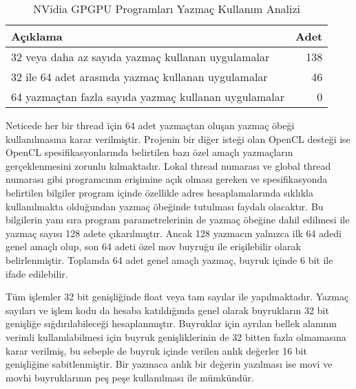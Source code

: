 \begin{longtable}{p{350pt} p{100pt} }
\caption{NVidia GPGPU Programları Yazmaç Kullanım Analizi} \label{table:NVidiaRegisterUsage} \\
\multicolumn{1}{l}{\textbf{Açıklama}} & \multicolumn{1}{r}{\textbf{Adet}}  \\ 
\hline 
\endfirsthead
32 veya daha az sayıda yazmaç kullanan uygulamalar  & \multicolumn{1}{r}{138} \\
32 ile 64 adet arasında yazmaç kullanan uygulamalar & \multicolumn{1}{r}{46}  \\
64 yazmaçtan fazla sayıda yazmaç kullanan uygulamalar & \multicolumn{1}{r}{0} \\
\end{longtable}

Neticede her bir thread için 64 adet yazmaçtan oluşan yazmaç öbeği kullanılmasına karar verilmiştir. Projenin bir diğer isteği olan OpenCL desteği ise OpenCL spesifikasyonlarında belirtilen bazı özel amaçlı yazmaçların gerçeklenmesini zorunlu kılmaktadır. Lokal thread numarası ve global thread numarası gibi programcının erişimine açık olması gereken ve spesifikasyonda belirtilen bilgiler program içinde özellikle adres hesaplamalarında sıklıkla kullanılmakta olduğundan yazmaç öbeğinde tutulması faydalı olacaktır. Bu bilgilerin yanı sıra program parametrelerinin de yazmaç öbeğine dahil edilmesi ile yazmaç sayısı 128 adete çıkarılmıştır. Ancak 128 yazmacın yalnızca ilk 64 adedi genel amaçlı olup, son 64 adeti özel mov buyruğu ile erişilebilir olarak belirlenmiştir. Toplamda 64 adet genel amaçlı yazmaç, buyruk içinde 6 bit ile ifade edilebilir. \par

Tüm işlemler 32 bit genişliğinde float veya tam sayılar ile yapılmaktadır. Yazmaç sayıları ve işlem kodu da hesaba katıldığında genel olarak buyrukların 32 bit genişliğe sığdırılabileceği hesaplanmıştır. Buyruklar için ayrılan bellek alanının verimli kullanılabilmesi için buyruk genişliklerinin de 32 bitten fazla olmamasına karar verilmiş, bu sebeple de buyruk içinde verilen anlık değerler 16 bit genişliğine sabitlenmiştir. Bir yazmaca anlık bir değerin yazılması ise movi ve movhi buyruklarının peş peşe kullanılması ile mümkündür. \par

